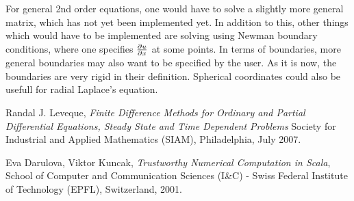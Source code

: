For general 2nd order equations, one would have to solve a slightly more
general matrix, which has not yet been implemented yet. In addition to
this, other things which would have to be implemented are solving
using Newman boundary conditions, where one specifies $\frac{\partial u}{\partial x}$ at
some points. In terms of boundaries, more general boundaries may also
want to be specified by the user. As it is now, the boundaries are
very rigid in their definition.
Spherical coordinates could also be usefull for radial
Laplace's equation.

\begin{thebibliography}{9}

    Randal J. Leveque,
    \emph{Finite Difference Methods for Ordinary and Partial Differential Equations,
        Steady State and Time Dependent Problems}
    Society for Industrial and Applied Mathematics (SIAM),
    Philadelphia,
    July 2007.

    Eva Darulova, Viktor Kuncak,
    \emph{Trustworthy Numerical Computation in Scala},
    School of Computer and Communication Sciences (I\&C) -
    Swiss Federal Institute of Technology (EPFL), Switzerland,
    2001.

\end{thebibliography}

